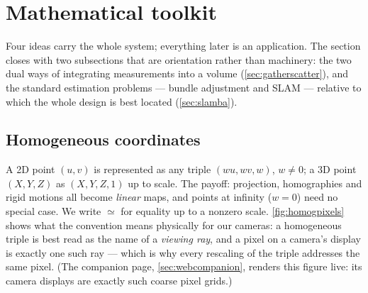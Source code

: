 \documentclass[11pt]{article}
\theoremstyle{definition}
\begin{document}
\section{Mathematical toolkit}
\label{sec:toolkit}

Four ideas carry the whole system; everything later is an application.
The section closes with two subsections that are orientation rather than
machinery: the two dual ways of integrating measurements into a volume
(\autoref{sec:gatherscatter}), and the standard estimation problems ---
bundle adjustment and SLAM --- relative to which the whole design is best
located (\autoref{sec:slamba}).

\subsection{Homogeneous coordinates}
A 2D point $(u,v)$ is represented as any triple $(wu, wv, w)$, $w\neq0$; a
3D point $(X,Y,Z)$ as $(X,Y,Z,1)$ up to scale. The payoff: projection,
homographies and rigid motions all become \emph{linear} maps, and points at
infinity ($w=0$) need no special case. We write $\simeq$ for equality up to
a nonzero scale. \autoref{fig:homogpixels} shows what the convention means
physically for our cameras: a homogeneous triple is best read as the name
of a \emph{viewing ray}, and a pixel on a camera's display is exactly one
such ray --- which is why every rescaling of the triple addresses the same
pixel. (The companion page, \autoref{sec:webcompanion}, renders this
figure live: its camera displays are exactly such coarse pixel grids.)
\end{document}
